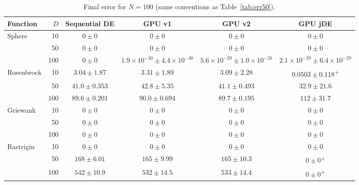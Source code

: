 \documentclass[conference]{IEEEtran}
\begin{document}
\begin{table}[p]
\vspace{1.5em}
\caption{Final error for $N=100$ (same conventions as Table~\ref{tab:err50}).}
\label{tab:err}
\begin{tabular}{lrcccc}
\toprule
Function & $D$ & Sequential DE & GPU v1 & GPU v2 & GPU jDE\\
\midrule
Sphere & 10 & $0\pm0$ & $0\pm0$ & $0\pm0$ & $0\pm0$\\
 & 50 & $0\pm0$ & $0\pm0$ & $0\pm0$ & $0\pm0$\\
 & 100 & $0\pm0$ & $1.9{\times}10^{-30}\pm4.4{\times}10^{-30}$ & $5.6{\times}10^{-29}\pm1.0{\times}10^{-28}$ & $2.1{\times}10^{-29}\pm6.4{\times}10^{-29}$\\
\midrule
Rosenbrock & 10 & $3.04\pm1.87$ & $3.31\pm1.89$ & $3.09\pm2.28$ & $0.0503\pm0.118$\textsuperscript{$+$}\\
 & 50 & $41.0\pm0.353$ & $42.8\pm5.35$ & $41.1\pm0.493$ & $32.9\pm21.6$\\
 & 100 & $89.6\pm0.201$ & $90.0\pm0.694$ & $89.7\pm0.195$ & $112\pm31.7$\\
\midrule
Griewank & 10 & $0\pm0$ & $0\pm0$ & $0\pm0$ & $0\pm0$\\
 & 50 & $0\pm0$ & $0\pm0$ & $0\pm0$ & $0\pm0$\\
 & 100 & $0\pm0$ & $0\pm0$ & $0\pm0$ & $0\pm0$\\
\midrule
Rastrigin & 10 & $0\pm0$ & $0\pm0$ & $0\pm0$ & $0\pm0$\\
 & 50 & $168\pm6.01$ & $165\pm9.99$ & $165\pm10.3$ & $0\pm0$\textsuperscript{$+$}\\
 & 100 & $542\pm10.9$ & $532\pm14.5$ & $533\pm14.4$ & $0\pm0$\textsuperscript{$+$}\\
\bottomrule
\end{tabular}


\end{table}
\end{document}
